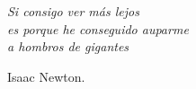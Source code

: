 \cleardoublepage %
\chapter*{}
\setlength{\leftmargin}{0.5\textwidth}
\setlength{\parsep}{0cm}
\addtolength{\topsep}{0.5cm}
\begin{flushright}
\small\em{
Si consigo ver más lejos\\
es porque he conseguido auparme\\ 
a hombros de gigantes 
}
\end{flushright}
\begin{flushright}
\small{
Isaac Newton.
}
\end{flushright}
\cleardoublepage %
